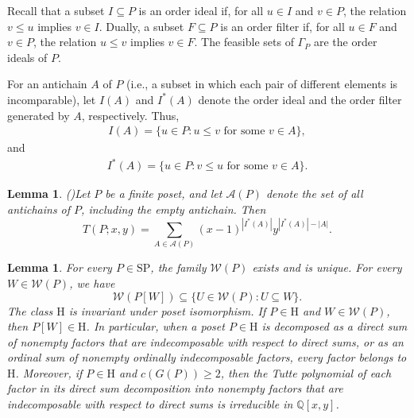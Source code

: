 \documentclass[11pt,a4paper]{article}
\newtheorem{lemma}[theorem]{Lemma}
\begin{document}

Recall that a subset $I\subseteq P$ is an order ideal if,
for all $u\in I$ and $v\in P$, the relation $v\leq u$ implies
$v\in I$. Dually, a subset $F\subseteq P$ is an order filter if,
for all $u\in F$ and $v\in P$, the relation $u\leq v$ implies
$v\in F$. The feasible sets of $\Gamma_P$ are the order ideals
of $P$.

For an antichain $A$ of $P$ (i.e., a subset in which each pair of different elements
is incomparable), let $I(A)$ and $I^*(A)$ denote the order ideal and the order filter generated by $A$,
respectively. Thus,
\begin{eqnarray*}
I(A)=\{u\in P:u\leq v\text{ for some }v\in A\},
\end{eqnarray*}
and
\begin{eqnarray*}
I^*(A)=\{u\in P:v\leq u\text{ for some }v\in A\}.
\end{eqnarray*}

\begin{lemma}(\cite{Gordon1993})\label{lem:antichain}
Let $P$ be a finite poset, and let $\mathcal A(P)$ denote
the set of all antichains of $P$, including the empty antichain. Then
\begin{equation}\label{eq:antichain-expansion}
T(P;x,y)=\sum_{A\in\mathcal A(P)}(x-1)^{|I^*(A)|}y^{|I^*(A)|-|A|}.
\end{equation}
\end{lemma}

\begin{lemma}\label{lem:H-inheritance}
For every $P\in\mathrm{SP}$, the family $\mathcal W(P)$
exists and is unique.
For every $W\in\mathcal W(P)$, we have
\begin{equation}\label{eq:W-inheritance}
\mathcal W(P[W])\subseteq\{U\in\mathcal W(P):U\subseteq W\}.
\end{equation}
The class $\mathrm H$ is invariant under poset isomorphism.
If $P\in\mathrm H$ and $W\in\mathcal W(P)$, then
$P[W]\in\mathrm H$.
In particular, when a poset $P\in\mathrm H$ is decomposed
as a direct sum of nonempty factors that are indecomposable
with respect to direct sums, or as an ordinal sum of nonempty
ordinally indecomposable factors, every factor belongs to $\mathrm H$.
Moreover, if $P\in\mathrm H$ and $c(G(P))\geq 2$,
then the Tutte polynomial of each factor in its direct sum
decomposition into nonempty factors that are indecomposable
with respect to direct sums is irreducible in $\mathbb Q[x,y]$.
\end{lemma}
\end{document}
